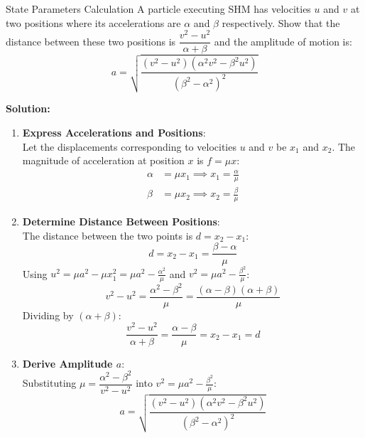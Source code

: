 \begin{examplebox}{State Parameters Calculation}
A particle executing SHM has velocities $u$ and $v$ at two positions where its accelerations are $\alpha$ and $\beta$ respectively. Show that the distance between these two positions is $\dfrac{v^2 - u^2}{\alpha + \beta}$ and the amplitude of motion is:
\begin{equation*}
    a = \sqrt{\frac{(v^2 - u^2)(\alpha^2 v^2 - \beta^2 u^2)}{(\beta^2 - \alpha^2)^2}}
\end{equation*}

\tcblower
\textbf{Solution:}

\begin{enumerate}[leftmargin=1.5em]
    \item \textbf{Express Accelerations and Positions}:\\
    Let the displacements corresponding to velocities $u$ and $v$ be $x_1$ and $x_2$.
    The magnitude of acceleration at position $x$ is $f = \mu x$:
    \begin{align*}
        \alpha &= \mu x_1 \implies x_1 = \frac{\alpha}{\mu} \\
        \beta &= \mu x_2 \implies x_2 = \frac{\beta}{\mu}
    \end{align*}
    
    \item \textbf{Determine Distance Between Positions}:\\
    The distance between the two points is $d = x_2 - x_1$:
    \begin{equation*}
        d = x_2 - x_1 = \frac{\beta - \alpha}{\mu}
    \end{equation*}
    Using $u^2 = \mu a^2 - \mu x_1^2 = \mu a^2 - \frac{\alpha^2}{\mu}$ and $v^2 = \mu a^2 - \frac{\beta^2}{\mu}$:
    \begin{equation*}
        v^2 - u^2 = \frac{\alpha^2 - \beta^2}{\mu} = \frac{(\alpha - \beta)(\alpha + \beta)}{\mu}
    \end{equation*}
    Dividing by $(\alpha + \beta)$:
    \begin{equation*}
        \frac{v^2 - u^2}{\alpha + \beta} = \frac{\alpha - \beta}{\mu} = x_2 - x_1 = d
    \end{equation*}
    
    \item \textbf{Derive Amplitude $a$}:\\
    Substituting $\mu = \dfrac{\alpha^2 - \beta^2}{v^2 - u^2}$ into $v^2 = \mu a^2 - \frac{\beta^2}{\mu}$:
    \begin{equation*}
        a = \sqrt{\frac{(v^2 - u^2)(\alpha^2 v^2 - \beta^2 u^2)}{(\beta^2 - \alpha^2)^2}}
    \end{equation*}
\end{enumerate}
\end{examplebox}

